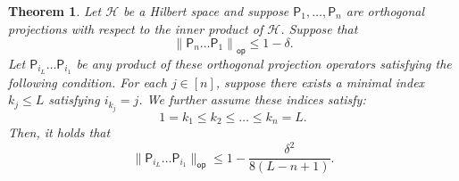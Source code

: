 \documentclass[11pt]{article}
\newtheorem{theorem}{Theorem}[section]
\begin{document}
\begin{theorem}
\label{thm:gen_gap_2}
        Let $\mathcal{H}$ be a Hilbert space and suppose $\mathsf{P}_1,\ldots, \mathsf{P}_n$ are orthogonal projections with respect to the inner product of $\mathcal{H}$. Suppose that
        \begin{equation}
    \left\|\mathsf{P}_n\ldots \mathsf{P}_1\right\|_{\mathsf{op}}\leq 1-\delta.
\end{equation} 
Let $\mathsf{P}_{i_L}\ldots \mathsf{P}_{i_1}$ be any product of these orthogonal projection operators satisfying the following condition. For each $j\in [n]$, suppose there exists a minimal index $k_j\leq L$ satisfying $i_{k_j}=j$. We further assume these indices satisfy:
\begin{equation}
\label{eq:order_2}
        1=k_1\leq k_2\leq\ldots\leq k_n=L.
\end{equation}
Then, it holds that
\begin{equation*}
    \|\mathsf{P}_{i_L}\ldots \mathsf{P}_{i_1}\|_{\mathsf{op}}\leq 1-\frac{\delta^2}{8(L-n+1)}.
\end{equation*}
\end{theorem}
\end{document}
